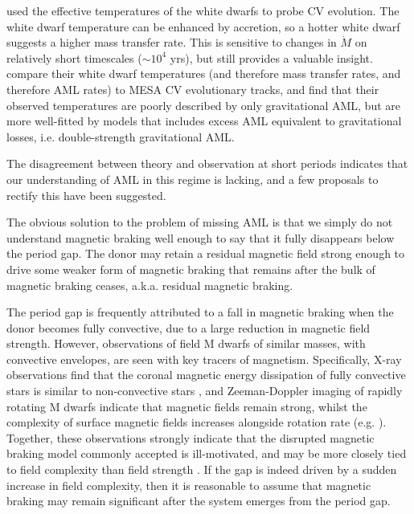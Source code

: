 \citet{Pala2017a} used the effective temperatures of the white dwarfs to probe CV evolution. The white dwarf temperature can be enhanced by accretion, so a hotter white dwarf suggests a higher mass transfer rate. This is sensitive to changes in $\dot M$ on relatively short timescales ($\sim 10^4$ yrs), but still provides a valuable insight. \citet{Pala2017a} compare their white dwarf temperatures (and therefore mass transfer rates, and therefore AML rates) to MESA CV evolutionary tracks, and find that their observed temperatures are poorly described by only gravitational AML, but are more well-fitted by models that includes excess AML equivalent to gravitational losses, i.e. double-strength gravitational AML.

The disagreement between theory and observation at short periods indicates that our understanding of AML in this regime is lacking, and a few proposals to rectify this have been suggested.

The obvious solution to the problem of missing AML is that we simply do not understand magnetic braking well enough to say that it fully disappears below the period gap. The donor may retain a residual magnetic field strong enough to drive some weaker form of magnetic braking that remains after the bulk of magnetic braking ceases, a.k.a. residual magnetic braking.

The period gap is frequently attributed to a fall in magnetic braking when the donor becomes fully convective, due to a large reduction in magnetic field strength. However, observations of field M dwarfs of similar masses, with convective envelopes, are seen with key tracers of magnetism. Specifically, X-ray observations find that the coronal magnetic energy dissipation of fully convective stars is similar to non-convective stars \citep{wright2016}, and Zeeman-Doppler imaging of rapidly rotating M dwarfs indicate that magnetic fields remain strong, whilst the complexity of surface magnetic fields increases alongside rotation rate (e.g. \citealt{donati2003,donati2009,marsden2011,waite2011,waite2015}).
Together, these observations strongly indicate that the disrupted magnetic braking model commonly accepted is ill-motivated, and may be more closely tied to field complexity than field strength \citep{garraffo2018b}. If the gap is indeed driven by a sudden increase in field complexity, then it is reasonable to assume that magnetic braking may remain significant after the system emerges from the period gap.


